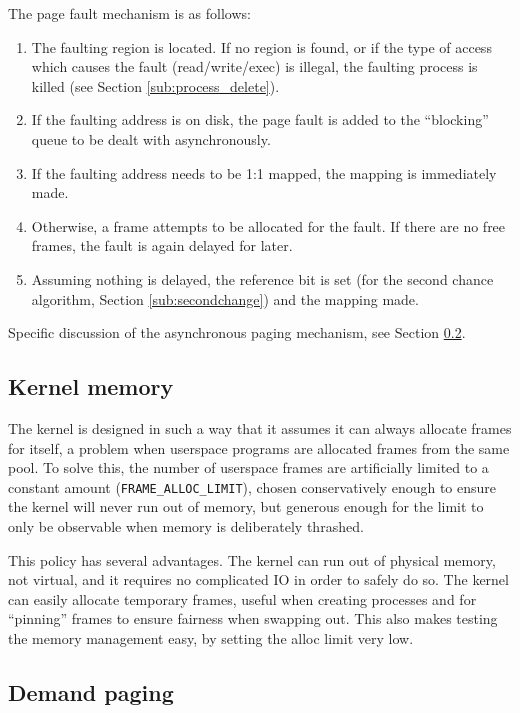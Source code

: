 \documentclass[12pt,english]{article}
\begin{document}
The page fault mechanism is as follows:
\begin{enumerate}
\item The faulting region is located.  If no region is found, or if the type of access which causes the fault (read/write/exec) is illegal, the faulting process is killed (see Section \ref{sub:process_delete}).
\item If the faulting address is on disk, the page fault is added to the ``blocking'' queue to be dealt with asynchronously.\item If the faulting address needs to be 1:1 mapped, the mapping is immediately made.
\item Otherwise, a frame attempts to be allocated for the fault.  If there are no free frames, the fault is again delayed for later.
\item Assuming nothing is delayed, the reference bit is set (for the second chance algorithm, Section \ref{sub:secondchange}) and the mapping made.
\end{enumerate}

Specific discussion of the asynchronous paging mechanism, see Section \ref{sub:demandpaging}.

\subsection{Kernel memory}

The kernel is designed in such a way that it assumes it can always allocate frames for itself, a problem when userspace programs are allocated frames from the same pool.  To solve this, the number of userspace frames are artificially limited to a constant amount (\texttt{FRAME\_ALLOC\_LIMIT}), chosen conservatively enough to ensure the kernel will never run out of memory, but generous enough for the limit to only be observable when memory is deliberately thrashed.

This policy has several advantages.  The kernel can run out of physical memory, not virtual, and it requires no complicated IO in order to safely do so.  The kernel can easily allocate temporary frames, useful when creating processes and for ``pinning'' frames to ensure fairness when swapping out.  This also makes testing the memory management easy, by setting the alloc limit very low.

\subsection{Demand paging} \label{sub:demandpaging}
\end{document}
